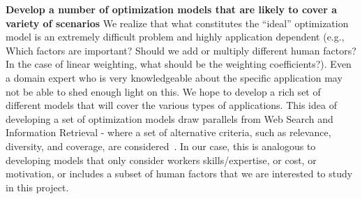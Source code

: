 {\bf Develop a number of optimization models that are likely to cover a variety of scenarios}  We realize that what constitutes the ``ideal'' optimization model is an extremely difficult problem and highly application dependent (e.g., Which factors are important? Should we add or multiply different human factors? In the case of linear weighting, what should be the weighting coefficients?). Even a domain expert who is very knowledgeable about the specific application may not be able to shed enough light on this. We hope to develop a rich set of different models that will cover the various types of applications. This idea of developing a set of optimization models draw parallels from Web Search and Information Retrieval - where a set of alternative criteria, such as relevance, diversity, and coverage, are considered~\cite{baeza1999modern}. In our case, this is analogous to developing models that only consider workers skills/expertise, or cost, or motivation, or includes a subset of human factors that we are interested to study in this project. 